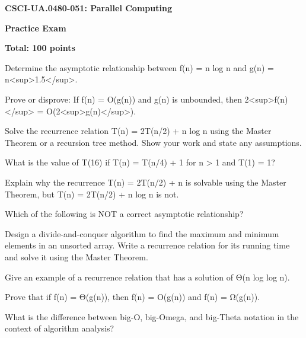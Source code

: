\documentclass[12pt]{article}
\begin{document}
\begin{center}
{\large\bfseries CSCI-UA.0480-051: Parallel Computing}

\vspace{0.2cm}

{\normalsize\bfseries Practice Exam}

\vspace{0.1cm}

{\normalsize\bfseries Total: 100 points}
\end{center}

\vspace{0.4cm}

Determine the asymptotic relationship between f(n) = n log n and g(n) = n<sup>1.5</sup>.


\vspace{0.3cm}
Prove or disprove: If f(n) = O(g(n)) and g(n) is unbounded, then 2<sup>f(n)</sup> = O(2<sup>g(n)</sup>).


\vspace{0.3cm}
Solve the recurrence relation T(n) = 2T(n/2) + n log n using the Master Theorem or a recursion tree method.  Show your work and state any assumptions.


\vspace{0.3cm}
What is the value of T(16) if T(n) = T(n/4) + 1 for n > 1 and T(1) = 1?


\vspace{0.3cm}
Explain why the recurrence T(n) = 2T(n/2) + n is solvable using the Master Theorem, but T(n) = 2T(n/2) + n log n is not.


\vspace{0.3cm}
Which of the following is NOT a correct asymptotic relationship?


\vspace{0.3cm}
Design a divide-and-conquer algorithm to find the maximum and minimum elements in an unsorted array. Write a recurrence relation for its running time and solve it using the Master Theorem.


\vspace{0.3cm}
Give an example of a recurrence relation that has a solution of Θ(n log log n).


\vspace{0.3cm}
Prove that if f(n) = Θ(g(n)), then f(n) = O(g(n)) and f(n) = Ω(g(n)).


\vspace{0.3cm}
What is the difference between big-O, big-Omega, and big-Theta notation in the context of algorithm analysis?
\end{document}
